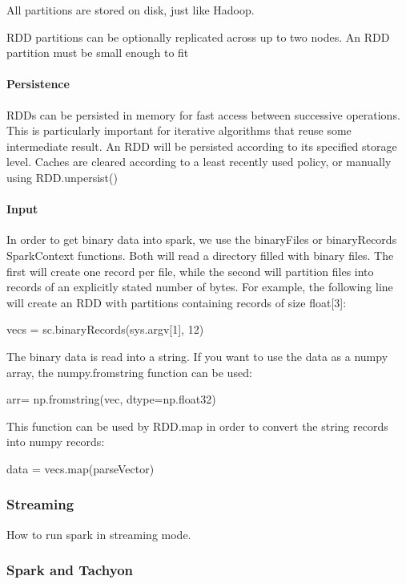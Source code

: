 \documentclass{sig-alternate}
\begin{document}
All partitions are stored on disk, just like Hadoop.

RDD partitions can be optionally replicated across up to two nodes. An
RDD partition must be small enough to fit

\paragraph{Persistence}\label{persistence}

RDDs can be persisted in memory for fast access between successive
operations. This is particularly important for iterative algorithms that
reuse some intermediate result. An RDD will be persisted according to
its specified storage level. Caches are cleared according to a least
recently used policy, or manually using RDD.unpersist()

\paragraph{Input}\label{input}

In order to get binary data into spark, we use the binaryFiles or
binaryRecords SparkContext functions. Both will read a directory filled
with binary files. The first will create one record per file, while the
second will partition files into records of an explicitly stated number
of bytes. For example, the following line will create an RDD with
partitions containing records of size float{[}3{]}:

vecs = sc.binaryRecords(sys.argv{[}1{]}, 12)

The binary data is read into a string. If you want to use the data as a
numpy array, the numpy.fromstring function can be used:

arr= np.fromstring(vec, dtype=np.float32)

This function can be used by RDD.map in order to convert the string
records into numpy records:

data = vecs.map(parseVector)

\subsubsection{Streaming}\label{streaming-1}

How to run spark in streaming mode.

\subsubsection{Spark and Tachyon}\label{spark-and-tachyon}
\end{document}
